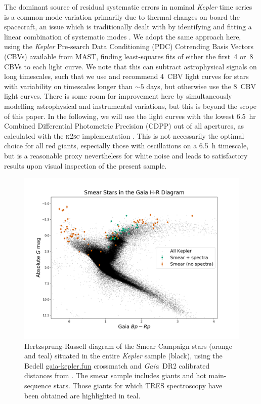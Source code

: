 \documentclass[a4paper,fleqn,usenatbib]{mnras}
\newcommand{\kepler}{\emph{Kepler}\xspace}
\newcommand{\gaia}{\emph{Gaia}\xspace}
\begin{document}
The dominant source of residual systematic errors in nominal \kepler time series is a common-mode variation primarily due to thermal changes on board the spacecraft, an issue which is traditionally dealt with by identifying and fitting a linear combination of systematic modes \citep{pdc0,pdc1,pdc2,petigura}. We adopt the same approach here, using the \kepler Pre-search Data Conditioning (PDC) Cotrending Basis Vectors (CBVs) available from MAST, finding least-squares fits of  either the first~4 or~8 CBVs to each light curve. We note that this can subtract astrophysical signals on long timescales, such that we use and recommend 4~CBV light curves for stars with variability on timescales longer than $\sim 5$ days, but otherwise use the 8~CBV light curves. There is some room for improvement here by simultaneously modelling astrophysical and instrumental variations, but this is beyond the scope of this paper. In the following, we will use the light curves with the lowest 6.5~hr Combined Differential Photometric Precision (CDPP) \citep{cdpp} out of all apertures, as calculated with the \textsc{k2sc} implementation \citep{k2sc}. This is not necessarily the optimal choice for all red giants, especially those with oscillations on a 6.5~h timescale, but is a reasonable proxy nevertheless for white noise and leads to satisfactory results upon visual inspection of the present sample.


\begin{figure}
\noindent\includegraphics[width=15cm,keepaspectratio]{gaia_kepler_hr.png}

\caption{\label{hrdiagram}
Hertzsprung-Russell diagram of the Smear Campaign stars (orange and teal) situated in the entire \kepler sample (black), using the Bedell \url{gaia-kepler.fun} crossmatch and \gaia~DR2 calibrated distances from \citet{gaiadists}. The smear sample includes giants and hot main-sequence stars. Those giants for which TRES spectroscopy have been obtained are highlighted in teal.}
\end{figure}
\end{document}
